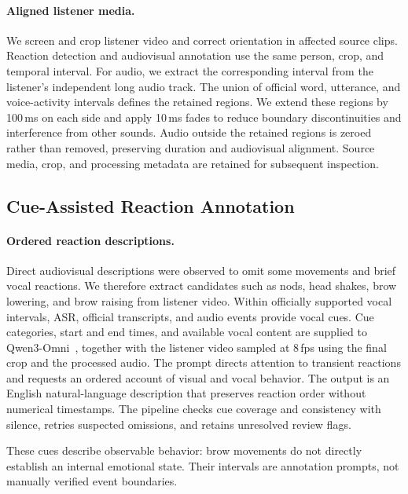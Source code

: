 \paragraph{Aligned listener media.}
We screen and crop listener video and correct orientation in affected source clips. Reaction detection and audiovisual annotation use the same person, crop, and temporal interval. For audio, we extract the corresponding interval from the listener's independent long audio track. The union of official word, utterance, and voice-activity intervals defines the retained regions. We extend these regions by 100\,ms on each side and apply 10\,ms fades to reduce boundary discontinuities and interference from other sounds. Audio outside the retained regions is zeroed rather than removed, preserving duration and audiovisual alignment. Source media, crop, and processing metadata are retained for subsequent inspection.

\subsection{Cue-Assisted Reaction Annotation}
\label{sec:annotation}
\paragraph{Ordered reaction descriptions.}
Direct audiovisual descriptions were observed to omit some movements and brief vocal reactions. We therefore extract candidates such as nods, head shakes, brow lowering, and brow raising from listener video. Within officially supported vocal intervals, ASR, official transcripts, and audio events provide vocal cues. Cue categories, start and end times, and available vocal content are supplied to Qwen3-Omni~\cite{qwen3omni}, together with the listener video sampled at 8\,fps using the final crop and the processed audio. The prompt directs attention to transient reactions and requests an ordered account of visual and vocal behavior. The output is an English natural-language description that preserves reaction order without numerical timestamps. The pipeline checks cue coverage and consistency with silence, retries suspected omissions, and retains unresolved review flags.

These cues describe observable behavior: brow movements do not directly establish an internal emotional state. Their intervals are annotation prompts, not manually verified event boundaries.

